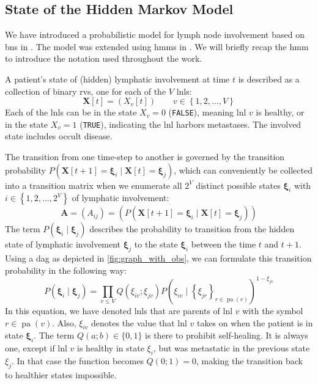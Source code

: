 \documentclass[twocolumn]{aastex631}
\begin{document}
\subsection{State of the Hidden Markov Model}
\label{subsec:formalism:state}

We have introduced a probabilistic model for lymph node involvement based on \glspl{bn} in \citep{pouymayou_bayesian_2019}. The model was extended using \glspl{hmm} in \citep{ludwig_hidden_2021}. We will briefly recap the \acrlong{hmm} to introduce the notation used throughout the work.

A patient's state of (hidden) lymphatic involvement at time $t$ is described as a collection of binary \glspl{rv}, one for each of the $V$ \glspl{lnl}:
%
\begin{equation}
    \mathbf{X}[t] = \left( X_v[t] \right) \qquad v \in \left\{ 1,2, \ldots, V \right\}
\end{equation}
%
Each of the \glspl{lnl} can be in the state $X_v=0$ (\texttt{FALSE}), meaning \gls{lnl} $v$ is healthy, or in the state $X_v=1$ (\texttt{TRUE}), indicating the \gls{lnl} harbors metastases. The involved state includes occult disease.

The transition from one time-step to another is governed by the transition probability $P\left( \mathbf{X}[t+1]=\boldsymbol{\xi}_i \mid \mathbf{X}[t]=\boldsymbol{\xi}_j \right)$, which can conveniently be collected into a transition matrix when we enumerate all $2^V$ distinct possible states $\boldsymbol{\xi}_i$ with $i \in \left\{ 1,2, \ldots, 2^V \right\}$ of lymphatic involvement:
%
\begin{equation}
    \mathbf{A} = \left( A_{ij} \right) = \left( P\left( \mathbf{X}[t+1]=\boldsymbol{\xi}_i \mid \mathbf{X}[t]=\boldsymbol{\xi}_j \right) \right)
\end{equation}
%
The term $P\left( \boldsymbol{\xi}_i \mid \boldsymbol{\xi}_j \right)$ describes the probability to transition from the hidden state of lymphatic involvement $\boldsymbol{\xi}_j$ to the state $\boldsymbol{\xi}_i$ between the time $t$ and $t+1$. Using a \gls{dag} as depicted in \autoref{fig:graph_with_obs}, we can formulate this transition probability in the following way:
%
\begin{equation}
    \label{eq:transition_prob}
    P\left( \boldsymbol{\xi}_i \mid \boldsymbol{\xi}_j \right) = \prod_{v \leq V} Q\left( \xi_{iv} ; \xi_{jv} \right) P \left( \xi_{iv} \mid \left\{ \xi_{jr} \right\}_{r \in \operatorname{pa}(v)} \right)^{1 - \xi_{jv}}
\end{equation}
%
In this equation, we have denoted \glspl{lnl} that are parents of \gls{lnl} $v$ with the symbol $r\in\operatorname{pa}(v)$. Also, $\xi_{iv}$ denotes the value that \gls{lnl} $v$ takes on when the patient is in state $\boldsymbol{\xi}_i$. The term $Q(a;b) \in \{ 0,1 \}$ is there to prohibit self-healing. It is always one, except if \gls{lnl} $v$ is healthy in state $\xi_i$, but was metastatic in the previous state $\xi_j$. In that case the function becomes $Q(0;1) = 0$, making the transition back to healthier states impossible.
\end{document}
